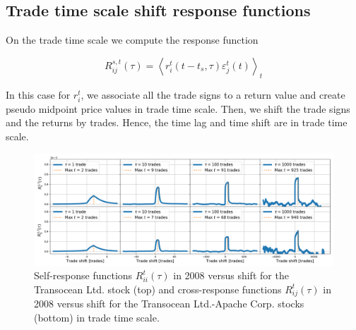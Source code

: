 \subsection{Trade time scale shift response functions}
\label{subsec:time_shift_trade}

On the trade time scale we compute the response function

\begin{equation}\label{eq:time_shift_trade}
    R_{ij}^{s, t}\left(\tau\right)=\left\langle r^{t}_{i}
    \left(t-t_{s},\tau\right) \varepsilon^{t}_{j}
    \left(t\right)\right\rangle _{t}
\end{equation}

In this case for $r^{t}_{i}$, we associate all the trade signs to a return
value and create pseudo midpoint price values in trade time scale. Then, we
shift the trade signs and the returns by trades. Hence, the time lag and time
shift are in trade time scale.

\begin{figure}[htbp]
    \centering
    \includegraphics[width=\textwidth]{figures/04_shift_trade_RIG_APA.png}
    \caption{Self-response functions $R_{ii}^{t}\left(\tau\right)$ in 2008
             versus shift for the Transocean Ltd. stock (top) and
             cross-response functions $R_{ij}^{t}\left(\tau\right)$ in 2008
             versus shift for the Transocean Ltd.-Apache Corp. stocks (bottom)
             in trade time scale.}
    \label{fig:shift_trade_scale}
\end{figure}

